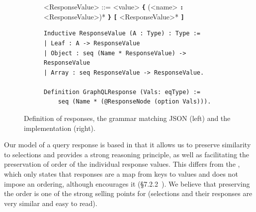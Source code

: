 \begin{figure}[h]
\centering
\begin{subfigure}{.5\textwidth}
    \begin{grammar}
    		<ResponseValue> ::= <value>
		\alt \textbf{\texttt{\{}} (<name> \textbf{\texttt{:}} <ResponseValue>)* \textbf{\texttt{\}}}
		\alt  \textbf{\texttt{[}} <ResponseValue>* \textbf{\texttt{]}}
 \end{grammar}
  \end{subfigure}%
  \begin{subfigure}{.5\textwidth}
\begin{verbatim}
Inductive ResponseValue (A : Type) : Type :=
| Leaf : A -> ResponseValue
| Object : seq (Name * ResponseValue) -> ResponseValue
| Array : seq ResponseValue -> ResponseValue.

Definition GraphQLResponse (Vals: eqType) :=
    seq (Name * (@ResponseNode (option Vals))).
\end{verbatim}
   
  \end{subfigure}
  \caption{Definition of \gql responses, the grammar matching JSON (left) and the \coq implementation (right).}
  \label{fig:response_def}

\end{figure}
%



Our model of a query response is based in that it allows us to preserve similarity to selections and provides a strong reasoning principle, as well as facilitating the preservation of order of the individual response values.  This differs from the \spec, which only states that responses are a map from keys to values and does not impose an ordering, although encourages it (\cf\S7.2.2~\cite{gqlspec}). We believe that preserving the order is one of the strong selling points for \gql (selections and their responses are very similar and easy to read). 



